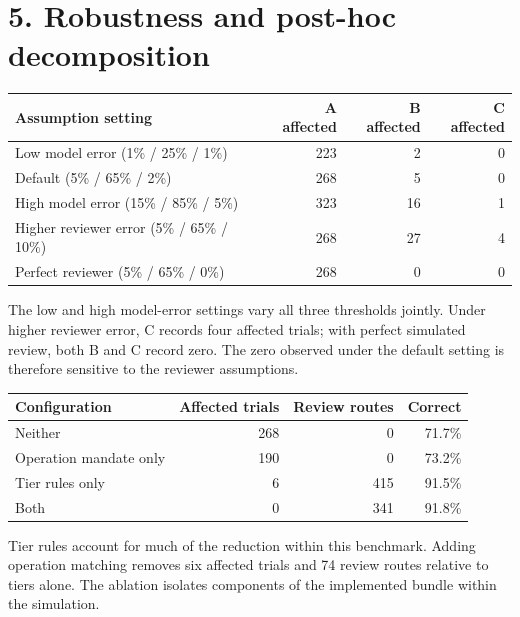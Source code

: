 \documentclass[11pt,letterpaper]{article}
\begin{document}
\section*{5. Robustness and post-hoc decomposition}
\par\medskip\noindent\begin{minipage}{\linewidth}
\captionsetup{justification=justified,singlelinecheck=false,skip=5pt}
\small\begin{tabularx}{\linewidth}{@{}Yrrr@{}}
\toprule
\textbf{Assumption setting} & \textbf{A affected} & \textbf{B affected} & \textbf{C affected} \\
\midrule
Low model error (1\% / 25\% / 1\%) & 223 & 2 & 0 \\
Default (5\% / 65\% / 2\%) & 268 & 5 & 0 \\
High model error (15\% / 85\% / 5\%) & 323 & 16 & 1 \\
Higher reviewer error (5\% / 65\% / 10\%) & 268 & 27 & 4 \\
Perfect reviewer (5\% / 65\% / 0\%) & 268 & 0 & 0 \\
\bottomrule
\end{tabularx}
\end{minipage}\par\medskip
The low and high model-error settings vary all three thresholds jointly. Under higher reviewer error, C records four affected trials; with perfect simulated review, both B and C record zero. The zero observed under the default setting is therefore sensitive to the reviewer assumptions.

\par\medskip\noindent\begin{minipage}{\linewidth}
\captionsetup{justification=justified,singlelinecheck=false,skip=5pt}
\small\begin{tabularx}{\linewidth}{@{}Yrrr@{}}
\toprule
\textbf{Configuration} & \textbf{Affected trials} & \textbf{Review routes} & \textbf{Correct} \\
\midrule
Neither & 268 & 0 & 71.7\% \\
Operation mandate only & 190 & 0 & 73.2\% \\
Tier rules only & 6 & 415 & 91.5\% \\
Both & 0 & 341 & 91.8\% \\
\bottomrule
\end{tabularx}
\end{minipage}\par\medskip
Tier rules account for much of the reduction within this benchmark. Adding operation matching removes six affected trials and 74 review routes relative to tiers alone. The ablation isolates components of the implemented bundle within the simulation.
\end{document}
